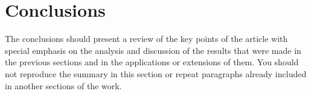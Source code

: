 \section{Conclusions}

The conclusions should present a review of the key points of the article with special emphasis on the analysis and discussion of the results that were made in the previous sections and in the applications or extensions of them. You should not reproduce the summary in this section or repeat paragraphs already included in another sections of the work.